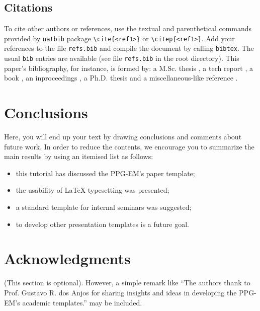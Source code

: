 \documentclass[date]{ppgem}
\begin{document}
\begin{multicols}{2}
\subsection{Citations}

To cite other authors or references, use the textual and parenthetical commands provided by \verb|natbib| package 
\verb|\cite{<ref1>}| or \verb|\citep{<ref1>}|. Add your references to the file \verb|refs.bib| and compile the document by calling \verb|bibtex|.
The usual \verb|bib| entries are available (see file \verb|refs.bib| in the root directory). This paper's bibliography, for instance, is formed by: a M.Sc. thesis \citep{rabellomsc2007}, a tech report \cite{amarante2001}, a book \citep{batchelor1994}, an inproceedings \cite{lima2009}, a Ph.D. thesis \citep{loureirophd2008} and a miscellaneous-like reference \citep{mangiavacchi2000}.

\section{Conclusions}

Here, you will end up your text by drawing conclusions and comments about future work. In order to reduce the contents, we encourage you to summarize the main results by using an itemised list as follows:
\begin{itemize}
\item this tutorial has discussed the PPG-EM's paper template;
\item the usability of {\LaTeX} typesetting was presented;
\item a standard template for internal seminars was suggested;
\item to develop other presentation templates is a future goal. 
\end{itemize}

\section{Acknowledgments}

(This section is optional). However, a simple remark like ``The authors thank to Prof. Gustavo R. dos Anjos for sharing insights and ideas in developing the PPG-EM's academic templates.'' 
may be included. 




\end{multicols}
\end{document}
